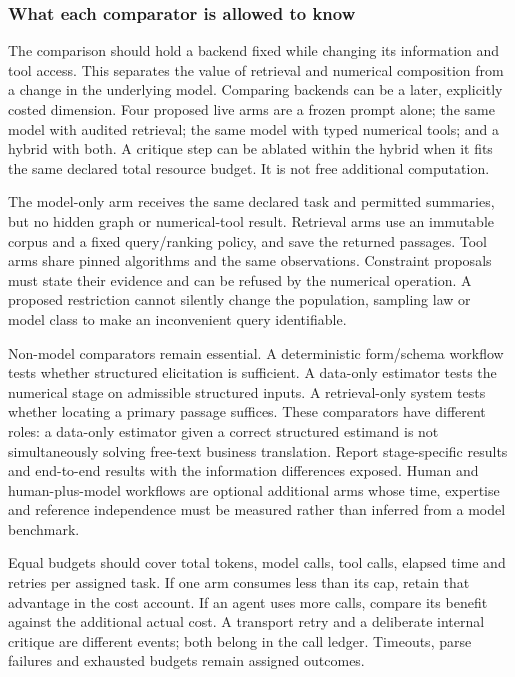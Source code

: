 \hypertarget{what-each-comparator-is-allowed-to-know}{%
\subsubsection{What each comparator is allowed to
know}\label{what-each-comparator-is-allowed-to-know}}

The comparison should hold a backend fixed while changing its
information and tool access. This separates the value of retrieval and
numerical composition from a change in the underlying model. Comparing
backends can be a later, explicitly costed dimension. Four proposed live
arms are a frozen prompt alone; the same model with audited retrieval;
the same model with typed numerical tools; and a hybrid with both. A
critique step can be ablated within the hybrid when it fits the same
declared total resource budget. It is not free additional computation.

The model-only arm receives the same declared task and permitted
summaries, but no hidden graph or numerical-tool result. Retrieval arms
use an immutable corpus and a fixed query/ranking policy, and save the
returned passages. Tool arms share pinned algorithms and the same
observations. Constraint proposals must state their evidence and can be
refused by the numerical operation. A proposed restriction cannot
silently change the population, sampling law or model class to make an
inconvenient query identifiable.

Non-model comparators remain essential. A deterministic form/schema
workflow tests whether structured elicitation is sufficient. A data-only
estimator tests the numerical stage on admissible structured inputs. A
retrieval-only system tests whether locating a primary passage suffices.
These comparators have different roles: a data-only estimator given a
correct structured estimand is not simultaneously solving free-text
business translation. Report stage-specific results and end-to-end
results with the information differences exposed. Human and
human-plus-model workflows are optional additional arms whose time,
expertise and reference independence must be measured rather than
inferred from a model benchmark.

Equal budgets should cover total tokens, model calls, tool calls,
elapsed time and retries per assigned task. If one arm consumes less
than its cap, retain that advantage in the cost account. If an agent
uses more calls, compare its benefit against the additional actual cost.
A transport retry and a deliberate internal critique are different
events; both belong in the call ledger. Timeouts, parse failures and
exhausted budgets remain assigned outcomes.

